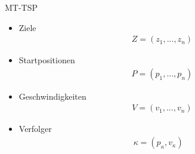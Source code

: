 \documentclass[10pt,table,xcolor=dvipsnames]{beamer}
\begin{document}
\begin{frame}{MT-TSP}
\begin{itemize}
\item Ziele
\begin{align*}
Z = (z_1, ..., z_n)
\end{align*} 
\item Startpositionen 
\begin{align*}
P = (p_1, ..., p_n)
\end{align*} 
\item Geschwindigkeiten
\begin{align*}
V = (v_1, ..., v_n)
\end{align*} 
\item Verfolger
\begin{align*}
\kappa = (p_\kappa,v_\kappa)~~~~
\end{align*}
\end{itemize}
\end{frame}
\end{document}
